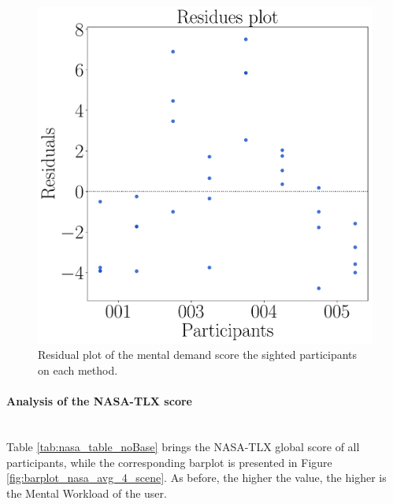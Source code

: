 \begin{figure}[!htb]
\begin{minipage}{0.075\textwidth}
        \hfill
    \end{minipage}
    \begin{minipage}{0.45\textwidth}
        \centering
        \includegraphics[width = \textwidth]{Resultados/Nasa/Figuras/pdf/residplot_md_avg_two_way_sight.pdf}
        \caption{Residual plot of the mental demand score the sighted participants on each method.}
        \label{fig:residplot_md_avg_two_way_sight}
    \end{minipage}
\end{figure}

\FloatBarrier



\paragraph{Analysis of the NASA-TLX score}\mbox{}\\

Table \ref{tab:nasa_table_noBase} brings the NASA-TLX global score of all participants, while the corresponding barplot is presented in Figure \ref{fig:barplot_nasa_avg_4_scene}. As before, the higher the value, the higher is the Mental Workload of the user.

